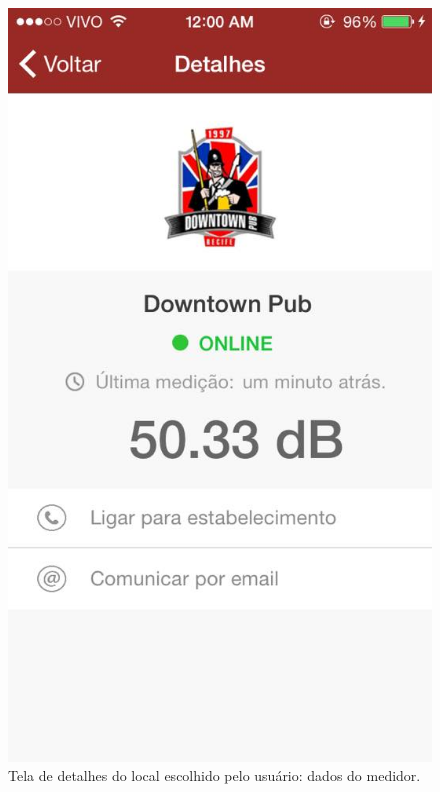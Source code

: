 \documentclass[
    12pt,               %
    openright,          %
    oneside,
    a4paper,            
    english,            %
    brazil              %
    ]{abntex2}
\begin{document}
\begin{figure}[!htb]
  \begin{center}
    \caption{\label{tela3}Tela de detalhes do local escolhido pelo usuário: dados do medidor.}
    \includegraphics[scale=0.25]{images/tela3-mod.jpg}
  \end{center}
\end{figure}
\end{document}
